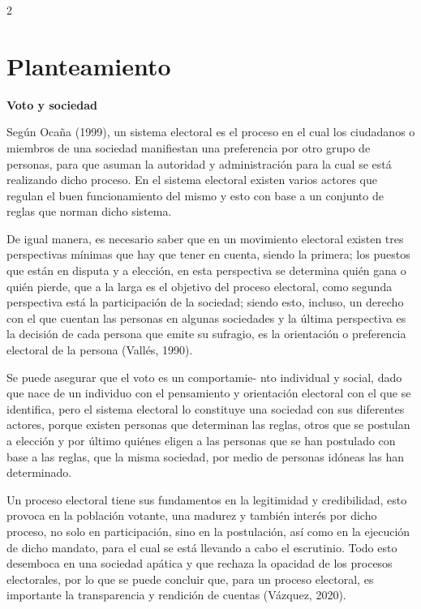 \documentclass[12pt,spanish,Letterpaper,openany]{book}
\begin{document}
\begin {multicols}{2}
\hypertarget{planteamiento}{%
\section*{Planteamiento}\label{planteamiento}}

\textbf{Voto y sociedad}

Según Ocaña (1999), un sistema electoral es el proceso en el cual los ciudadanos o miembros de una sociedad manifiestan una preferencia por otro grupo de personas, para que asuman la autoridad y administración para la cual se está realizando dicho proceso. En el sistema electoral existen varios actores que regulan el buen funcionamiento del mismo y esto con base a un conjunto de reglas que norman dicho sistema.

De igual manera, es necesario saber que en un movimiento electoral existen tres perspectivas mínimas que hay que tener en cuenta, siendo la primera; los puestos que están en disputa y a elección, en esta perspectiva se determina quién gana o quién pierde, que a la larga es el objetivo del proceso electoral, como segunda perspectiva está la participación de la sociedad; siendo esto, incluso, un derecho con el que cuentan las personas en algunas sociedades y la última perspectiva es la decisión de cada persona que emite su sufragio, es la orientación o preferencia electoral de la persona (Vallés, 1990).

Se puede asegurar que el voto es un comportamie-
nto individual y social, dado que nace de un individuo con el pensamiento y orientación electoral con el que se identifica, pero el sistema electoral lo constituye una sociedad con sus diferentes actores, porque existen personas que determinan las reglas, otros que se postulan a elección y por último quiénes eligen a las personas que se han postulado con base a las reglas, que la misma sociedad, por medio de personas idóneas las han determinado.

Un proceso electoral tiene sus fundamentos en la legitimidad y credibilidad, esto provoca en la población votante, una madurez y también interés por dicho proceso, no solo en participación, sino en la postulación, así como en la ejecución de dicho mandato, para el cual se está llevando a cabo el escrutinio. Todo esto desemboca en una sociedad apática y que rechaza la opacidad de los procesos electorales, por lo que se puede concluir que, para un proceso electoral, es importante la transparencia y rendición de cuentas (Vázquez, 2020).


\end{multicols}
\end{document}
